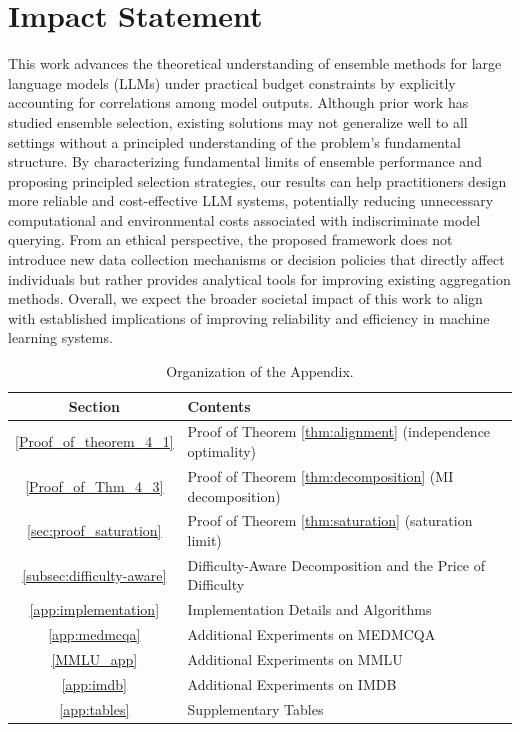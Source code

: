 \documentclass{article}
\theoremstyle{plain}
\theoremstyle{definition}
\theoremstyle{remark}
\begin{document}
\section*{Impact Statement}

This work advances the theoretical understanding of ensemble methods for large language models (LLMs) under practical budget constraints by explicitly accounting for correlations among model outputs. Although prior work has studied ensemble selection, existing solutions may not generalize well to all settings without a principled understanding of the problem’s fundamental structure. By characterizing fundamental limits of ensemble performance and proposing principled selection strategies, our results can help practitioners design more reliable and cost-effective LLM systems, potentially reducing unnecessary computational and environmental costs associated with indiscriminate model querying. From an ethical perspective, the proposed framework does not introduce new data collection mechanisms or decision policies that directly affect individuals but rather provides analytical tools for improving existing aggregation methods. Overall, we expect the broader societal impact of this work to align with established implications of improving reliability and efficiency in machine learning systems.
\newpage


\newpage
\appendix
\onecolumn
{\par}


\begin{table}[h]
\centering
\caption{Organization of the Appendix.}
\label{tab:appendix_overview}
\renewcommand{\arraystretch}{1.5}
\begin{tabular}{@{}cl@{}}
\toprule
\textbf{Section} & \textbf{Contents} \\
\midrule
\ref{Proof_of_theorem_4_1} & Proof of Theorem \ref{thm:alignment} (independence optimality) \\[0.4em]
\ref{Proof_of_Thm_4_3} & Proof of Theorem \ref{thm:decomposition} (MI decomposition) \\[0.4em]
\ref{sec:proof_saturation} & Proof of Theorem \ref{thm:saturation} (saturation limit) \\[0.4em]
\ref{subsec:difficulty-aware} & Difficulty-Aware Decomposition and the Price of Difficulty \\[0.4em]
\ref{app:implementation} & Implementation Details and Algorithms \\[0.4em]
\ref{app:medmcqa} & Additional Experiments on MEDMCQA \\[0.4em]
\ref{MMLU_app} & Additional Experiments on MMLU \\[0.4em]
\ref{app:imdb} & Additional Experiments on IMDB \\[0.4em]
\ref{app:tables} & Supplementary Tables \\
\bottomrule
\end{tabular}
\end{table}
\vspace*{\fill}
\newpage
\end{document}
